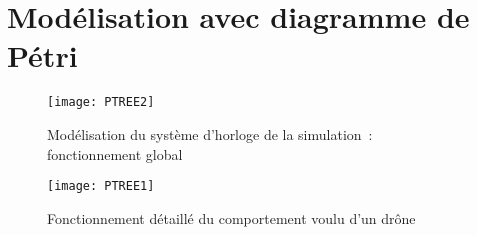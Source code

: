 \section{Modélisation avec diagramme de Pétri}

\begin{figure}[H]
    \centering
    \texttt{[image: PTREE2]}
    \caption{Modélisation du système d'horloge de la simulation : fonctionnement global}
\end{figure}

\begin{figure}[H]
    \centering
    \texttt{[image: PTREE1]}
    \caption{Fonctionnement détaillé du comportement voulu d'un drône}
\end{figure}

